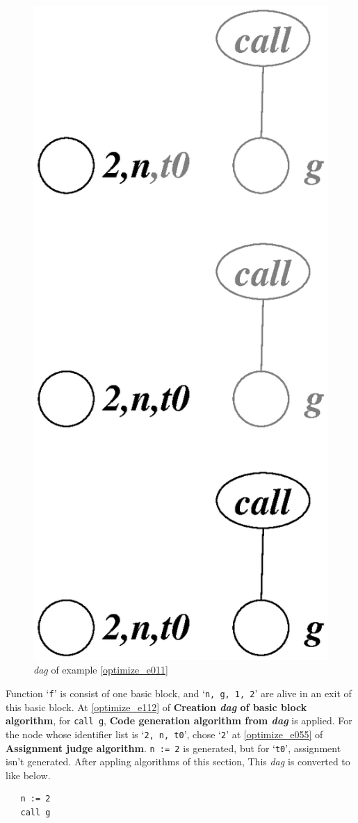 \begin{Example}
\begin{figure}[htbp]
\begin{center}
\begin{latexonly}
\includegraphics[width=0.530\linewidth,height=1.0\linewidth]{opt003.eps}
\end{latexonly}
\caption{{\em dag} of example \ref{optimize_e011}}
\label{optimize_e012}
\end{center}
\end{figure}
Function `{\tt{f}}' is consist of one basic block, and 
`{\tt{n, g, 1, 2}}' are alive in an exit of this basic block.
At \ref{optimize_e112} of {\bf Creation {\em dag} of basic block algorithm},
for {\tt{call g}},
{\bf Code generation algorithm from {\em dag}} is applied.
For the node whose identifier list is `{\tt{2, n, t0}}',
chose `{\tt{2}}'
at \ref{optimize_e055} of {\bf Assignment judge algorithm}.
{\tt{n := 2}} is generated, but for `{\tt{t0}}', 
assignment isn't generated. 
After appling algorithms of this section,
This {\em dag} is converted to like below.
\begin{verbatim}
   n := 2
   call g
\end{verbatim}
\end{Example}

